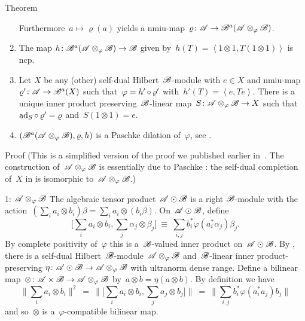 \begin{parsec}
\begin{point}{Theorem}
\begin{enumerate}
\begin{equation*}
            \end{equation*}
    Furthermore~$a \mapsto \varrho(a)$
        yields a
        nmiu-map~$\varrho\colon \mathscr{A} \to \mathscr{B}^a(\mathscr{A}\otimes_\varphi \mathscr{B})$.
\item
    The map
    $h\colon \mathscr{B}^a(\mathscr{A}\otimes_\varphi\mathscr{B}) \to \mathscr{B}$
    given by~$h(T) =\left<1 \otimes 1, T(1 \otimes 1)\right>$
    is ncp.
\item
Let $X$ be any (other) self-dual Hilbert~$\mathscr{B}$-module with $e \in X$ and
        nmiu-map~$\varrho'\colon \mathscr{A} \to \mathscr{B}^a(X)$
        such that~$\varphi  = h' \mathop{\circ} \varrho'$
        with~$h'(T) = \left<e,T e\right>$.
There is a unique
        inner product preserving~$\mathscr{B}$-linear
        map~$S \colon \mathscr{A}\otimes_\varphi\mathscr{B} \to X$
        such that~$\mathrm{ad}_S \mathop{\circ} \varrho' = \varrho$
        and~$S( 1\otimes 1) = e$.
\item
$(\mathscr{B}^a(\mathscr{A} \otimes_\varphi \mathscr{B}), \varrho, h)$
        is a Paschke dilation of~$\varphi$, see .
\end{enumerate}
\begin{point}{Proof}%
(This is a simplified version of the proof
    we published earlier in~\cite{wwpaschke}.
The construction of~$\mathscr{A} \otimes_\varphi \mathscr{B}$
    is essentially due to Paschke \cite[Thm.~5.2]{paschke}:
    the self-dual completion of~$X$ in \cite[Thm.~5.2]{paschke}
    is isomorphic to~$\mathscr{A} \otimes_\varphi \mathscr{B}$.)
\begin{point}{1: $\mathscr{A} \otimes_\varphi \mathscr{B}$}%
The algebraic tensor product~$\mathscr{A} \odot \mathscr{B}$
    is a right $\mathscr{B}$-module
with the action~$(\sum_i a_i \otimes b_i)\beta = \sum_i a_i \otimes(b_i\beta)$.
On~$\mathscr{A} \odot \mathscr{B}$, define
\begin{equation*}
    \bigl[\sum_i a_i \otimes b_i, \sum_j \alpha_j \otimes \beta_j\bigr]
    \ \equiv\  \sum_{i,j} b_i^* \varphi(a_i^*\alpha_j)\beta_j.
\end{equation*}
By complete positivity of~$\varphi$
this is a~$\mathscr{B}$-valued inner product on~$\mathscr{A} \odot \mathscr{B}$.
By ,
    there is a self-dual Hilbert~$\mathscr{B}$-module~$\mathscr{A}\otimes_\varphi \mathscr{B}$
    and~$\mathscr{B}$-linear inner product-preserving
    $\eta\colon \mathscr{A} \odot \mathscr{B} \to \mathscr{A} \otimes_\varphi \mathscr{B}$
    with ultranorm dense range.
Define a bilinear map~$\otimes \colon \mathscr{A} \times \mathscr{B} \to \mathscr{A} \otimes_\varphi \mathscr{B}$
    by~$a \otimes b = \eta(a \otimes b)$.
By definition we have
\begin{equation*}
\bigl\| \sum_i a_i \otimes b_i \bigr\|^2
    \ =\  \bigl\|\bigl[ \sum_i a_i\otimes b_i, \sum_j a_j \otimes b_j \bigr]\bigr\|
    \ =\  \bigl\|\sum_{i,j} b_i^* \varphi(a_i^*a_j) b_j\bigr\|
\end{equation*}
and so~$\otimes$ is a~$\varphi$-compatible bilinear map.


\end{point}
\end{point}
\end{point}
\end{parsec}
